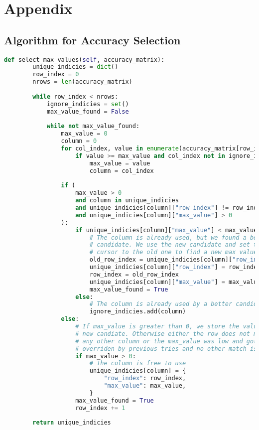 \section{Appendix}

\subsection{Algorithm for Accuracy Selection}

\begin{lstlisting}[language=Python, caption=Select relevant accuracy values from a accuracy matrix., label={lst:select_max_values}]
    def select_max_values(self, accuracy_matrix):
        unique_indicies = dict()
        row_index = 0
        nrows = len(accuracy_matrix)
        
        while row_index < nrows:
            ignore_indicies = set()
            max_value_found = False
    
            while not max_value_found:
                max_value = 0
                column = 0
                for col_index, value in enumerate(accuracy_matrix[row_index]):
                    if value >= max_value and col_index not in ignore_indicies:
                        max_value = value
                        column = col_index
    
                if (
                    max_value > 0
                    and column in unique_indicies
                    and unique_indicies[column]["row_index"] != row_index
                    and unique_indicies[column]["max_value"] > 0
                ):
                    if unique_indicies[column]["max_value"] < max_value:
                        # The column is already used, but we found a better 
                        # candidate. We use the new candidate and set the 
                        # cursor to the old one to find a new max value.
                        old_row_index = unique_indicies[column]["row_index"]
                        unique_indicies[column]["row_index"] = row_index
                        row_index = old_row_index
                        unique_indicies[column]["max_value"] = max_value
                        max_value_found = True
                    else:
                        # The column is already used by a better candidate.
                        ignore_indicies.add(column)
                else:
                    # If max_value is greater than 0, we store the value as a 
                    # new candiate. Otherwise either the row does not match 
                    # any other column or the max_value was low and got 
                    # overriden by previous tries and no other match is available. 
                    if max_value > 0:
                        # The column is free to use
                        unique_indicies[column] = {
                            "row_index": row_index,
                            "max_value": max_value,
                        }
                    max_value_found = True
                    row_index += 1
        
        return unique_indicies
\end{lstlisting}
